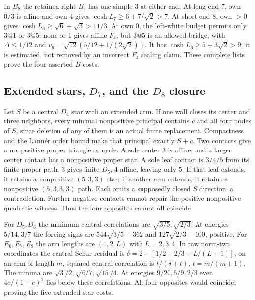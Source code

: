 \documentclass[11pt]{article}
\theoremstyle{definition}
\theoremstyle{remark}
\begin{document}
In $B_8$ the retained right $B_2$ has one simple $3$ at either
end. At long end $7$, own $0/3$ is affine and own $4$ gives
$\cosh L_7\ge6+7/\sqrt2>7$.
At short end $8$, own $>0$ gives
$\cosh L_6\ge\sqrt6+\sqrt3>11/3$.
At own $0$, the left-white budget permits only $3@1$ or $3@5$:
none or $1$ gives affine $F_4$, but $3@5$ is an allowed bridge,
with $\Delta\le1/12$ and
$v_6=\sqrt{12}(5/12+1/(2\sqrt2))$.
It has $\cosh L_6\ge5+3\sqrt2>9$; it is estimated, not removed
by an incorrect $F_4$ sealing claim. These complete lists prove
the four asserted $B$ costs.

\subsection[Extended stars, D7, and the D8 closure]{Extended stars, \texorpdfstring{$D_7$}{D7}, and the \texorpdfstring{$D_8$}{D8} closure}

Let $S$ be a central $D_4$ star with an extended arm. If one wall
closes its center and three neighbors, every minimal nonpositive
principal contains $c$ and all four nodes of $S$, since deletion
of any of them is an actual finite replacement. Compactness and
the Lann\'er order bound make that principal exactly $S+c$.
Two contacts give a nonpositive proper triangle or cycle.
A sole center $3$ is affine, and a larger center contact has a
nonpositive proper star. A sole leaf contact is $3/4/5$ from its
finite proper path: $3$ gives finite $D_5$, $4$ affine, leaving
only $5$. If that leaf extends, it retains a nonpositive $(5,3,3)$
star; if another arm extends, it retains a nonpositive $(5,3,3,3)$
path. Each omits a supposedly closed $S$ direction, a contradiction.
Further negative contacts cannot repair the positive nonpositive
quadratic witness. Thus the four opposites cannot all coincide.

For $D_5,D_6$ the minimum central correlations are
$\sqrt{3/5},\sqrt{2/3}$. At energies $5/14,3/7$ the forcing
signs are $544\sqrt{3/5}-362$ and $127\sqrt{2/3}-100$, positive.
For $E_6,E_7,E_8$ the arm lengths are $(1,2,L)$ with $L=2,3,4$.
In raw norm-two coordinates the central Schur residual is
$\delta=2-[1/2+2/3+L/(L+1)]$; on an arm of length $m$, squared
central correlation is $t/(\delta+t)$, $t=m/(m+1)$.
The minima are $\sqrt3/2,\sqrt{6/7},\sqrt{15}/4$.
At energies $9/20,5/9,2/3$ even $4e/(1+e)^2$ lies below these
correlations. All four opposites would coincide, proving the five
extended-star costs.
\end{document}
